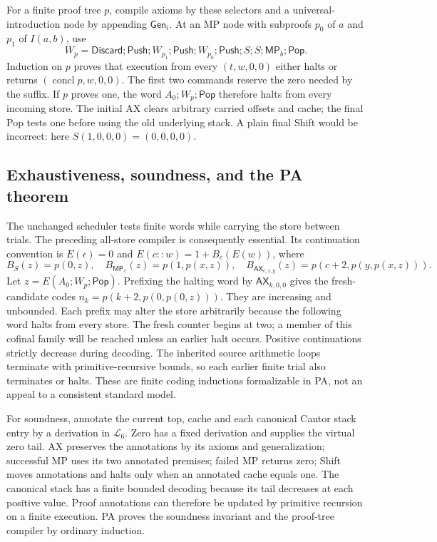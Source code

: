 For a finite proof tree $p$, compile axioms by these selectors and a
universal-introduction node by appending $\mathsf{Gen}_i$.  At an MP node
with subproofs $p_0$ of $a$ and $p_1$ of $I(a,b)$, use
\[
 W_p=\mathsf{Discard};\mathsf{Push};W_{p_1};\mathsf{Push};
 W_{p_0};\mathsf{Push};S;S;\mathsf{MP}_b;\mathsf{Pop}.
\]
Induction on $p$ proves that execution from every $(t,w,0,0)$ either halts
or returns $(\operatorname{concl}p,w,0,0)$.  The first two commands reserve
the zero needed by the suffix.  If $p$ proves one, the word
$A_0;W_p;\mathsf{Pop}$ therefore halts from every incoming store.
The initial AX clears arbitrary carried offsets and cache; the final Pop
tests one before using the old underlying stack.  A plain final Shift
would be incorrect: here $S(1,0,0,0)=(0,0,0,0)$.

\subsection{Exhaustiveness, soundness, and the PA theorem}

The unchanged scheduler tests finite words while carrying the store between
trials.  The preceding all-store compiler is consequently essential.
Its continuation convention is $E(\epsilon)=0$ and
$E(c::w)=1+B_c(E(w))$, where
\[
 B_S(z)=p(0,z),\quad B_{\mathsf{MP}_x}(z)=p(1,p(x,z)),\quad
 B_{\mathsf{AX}_{c,x,y}}(z)=p(c+2,p(y,p(x,z))).
\]
Let $z=E(A_0;W_p;\mathsf{Pop})$.  Prefixing the halting word by
$\mathsf{AX}_{k,0,0}$ gives the fresh-candidate codes
$n_k=p(k+2,p(0,p(0,z)))$.  They are increasing and unbounded.  Each prefix
may alter the store arbitrarily because the following word halts from
every store.  The fresh counter begins at two; a member of this cofinal
family will be reached unless an earlier halt occurs.  Positive
continuations strictly decrease during decoding.  The inherited source
arithmetic loops terminate with primitive-recursive bounds, so each earlier
finite trial also terminates or halts.  These are finite coding inductions
formalizable in PA, not an appeal to a consistent standard model.

For soundness, annotate the current top, cache and each canonical Cantor
stack entry by a derivation in $\mathcal L_6$.  Zero has a fixed derivation
and supplies the virtual zero tail.  AX preserves the annotations by its
axioms and generalization; successful MP uses its two annotated premises;
failed MP returns zero; Shift moves annotations and halts only when an
annotated cache equals one.  The canonical stack has a finite bounded
decoding because its tail decreases at each positive value.
Proof annotations can therefore be updated by primitive recursion on a
finite execution.  PA proves the soundness invariant and the proof-tree
compiler by ordinary induction.

